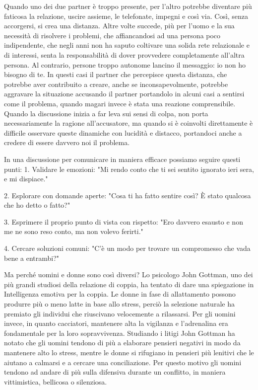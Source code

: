 \documentclass[12pt]{book} %
\begin{document}
Quando uno dei due partner è troppo presente, per l'altro potrebbe diventare più faticosa la relazione, uscire assieme, le telefonate, impegni e così via. Così, senza accorgersi, si crea una distanza. Altre volte succede, più per
l'uomo e la sua necessità di risolvere i problemi, che affiancandosi ad una persona poco indipendente, che negli anni non ha saputo coltivare una solida rete relazionale e di interessi, senta la responsabilità di
dover provvedere completamente all'altra persona. Al contrario, persone troppo autonome
lancino il messaggio: io non ho bisogno di te. In questi casi il partner che percepisce questa distanza, che potrebbe aver contribuito a creare, anche se inconsapevolmente, potrebbe aggravare la situazione accusando il partner portandolo in alcuni casi a sentirsi come il problema, quando magari invece è stata una reazione
comprensibile. Quando la discussione inizia a far leva sui sensi di colpa, non porta necessariamente la ragione all'accusatore, ma quando si è coinvolti direttamente è difficile osservare queste dinamiche con lucidità e distacco, portandoci anche a credere di essere davvero noi il problema.

In una discussione per comunicare in maniera efficace possiamo seguire questi punti:
1. Validare le emozioni:
"Mi rendo conto che ti sei sentito ignorato ieri sera, e mi dispiace."

2. Esplorare con domande aperte:
"Cosa ti ha fatto sentire così? È stato qualcosa che ho detto o fatto?"

3. Esprimere il proprio punto di vista con rispetto:
"Ero davvero esausto e non me ne sono reso conto, ma non volevo ferirti."

4. Cercare soluzioni comuni:
"C'è un modo per trovare un compromesso che vada bene a entrambi?"

Ma perché uomini e donne sono così diversi? Lo psicologo John Gottman, uno dei più grandi studiosi della relazione di
coppia, ha tentato di dare una spiegazione in Intelligenza emotiva per la
coppia. Le donne in fase di allattamento possono produrre più o meno
latte in base allo stress, perciò la selezione naturale ha premiato gli individui che riuscivano velocemente a
rilassarsi. Per gli uomini invece, in quanto cacciatori, mantenere alta la vigilanza e
l'adrenalina era fondamentale per la loro sopravvivenza. Studiando i litigi John Gottman ha notato
che gli uomini tendono di più a elaborare pensieri negativi in modo da mantenere alto lo stress, mentre le donne si
rifugiano in pensieri più lenitivi che le aiutano a calmarsi e a cercare una conciliazione.
Per questo motivo gli uomini tendono ad andare di più sulla difensiva durante un conflitto, in maniera vittimistica,
bellicosa o silenziosa.
\end{document}
